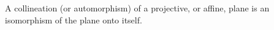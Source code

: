 A collineation (or automorphism) of a projective, or affine, plane is an isomorphism of the plane onto itself.
